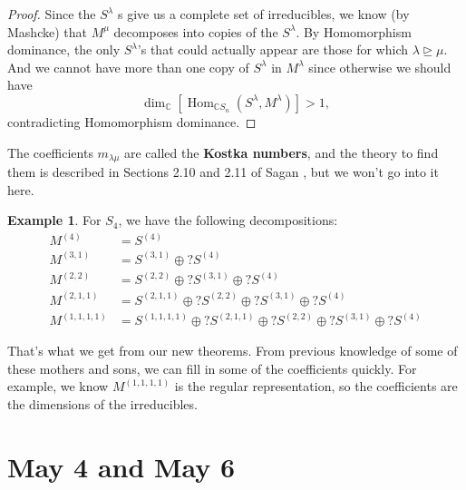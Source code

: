 \documentclass[12pt]{article}
\newcommand{\cx}{\mathbb{C}}
\newcommand\paren[1]{\left( #1 \right)}
\theoremstyle{definition}
\newtheorem{example}{Example}[section]
\DeclareMathOperator\Hom{Hom}
\begin{document}
\begin{proof}
    Since the $S^{\lambda}$
    s give us a complete set of irreducibles, we know (by Mashcke) that $M^{\mu}$ decomposes into copies of the $S^{\lambda}$. By Homomorphism dominance, the only $S^{\lambda}$'s that could actually appear are those for which $\lambda \trianglerighteq \mu$. And we cannot have more than one copy of $S^{\lambda}$ in $M^{\lambda}$ since otherwise we should have 
    \begin{equation*}
        \dim_{\cx} \left[ \Hom_{\cx S_n} \paren{ S^{\lambda} , M^{\lambda} } \right] > 1,
    \end{equation*}
    contradicting Homomorphism dominance.
\end{proof}
The coefficients $m_{\lambda \mu}$ are called the \textbf{Kostka numbers}, and the theory to find them is described in Sections 2.10 and 2.11 of Sagan \cite{Sagan}, but we won't go into it here.
\begin{example}
    For $S_4$, we have the following decompositions:
    \begin{align*}
        M^{(4)} & = S^{(4)} \\
        M^{(3,1)} & = S^{(3,1)} \oplus ? S^{(4)} \\
        M^{(2,2)} & = S^{(2,2)} \oplus ? S^{(3,1)} \oplus ? S^{(4)} \\
        M^{(2,1,1)} & = S^{(2,1,1)} \oplus ? S^{(2,2)} \oplus ? S^{(3,1)} \oplus ? S^{(4)} \\
        M^{(1,1,1,1)} & = S^{(1,1,1,1)} \oplus ? S^{(2,1,1)} \oplus ? S^{(2,2)} \oplus ? S^{(3,1)} \oplus ? S^{(4)}
    \end{align*}
\end{example}
That's what we get from our new theorems. From previous knowledge of some of these mothers and sons, we can fill in some of the coefficients quickly. For example, we know $M^{(1,1,1,1)}$ is the regular representation, so the coefficients are the dimensions of the irreducibles.

\section{May 4 and May 6}
\end{document}
